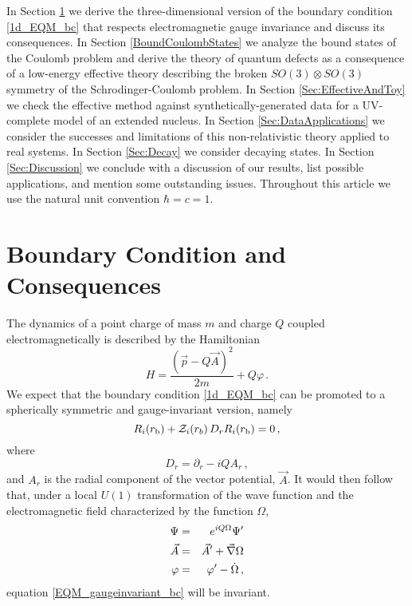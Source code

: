\documentclass[pra,twocolumn,nofootinbib, superscriptaddress]{revtex4}%
\def\sec#1{\section{#1} }
\def\({\left(}
\def\){\right)}
\def\f#1#2{\frac{#1}{#2}}
\def\d{\partial}
\def\del{\nabla}
\begin{document}
In Section \ref{Gauge_invariance} we derive the three-dimensional version of the boundary condition \eqref{1d_EQM_bc} that respects electromagnetic gauge invariance and discuss its consequences. In Section \ref{BoundCoulombStates} we analyze the bound states of the Coulomb problem and derive the theory of quantum defects as a consequence of a low-energy effective theory describing the broken $SO(3)\otimes SO(3)$ symmetry of the Schrodinger-Coulomb problem. In Section \ref{Sec:EffectiveAndToy} we check the effective method against synthetically-generated data for a UV-complete model of an extended nucleus. In Section \ref{Sec:DataApplications} we consider the successes and limitations of this non-relativistic theory applied to real systems. In Section \ref{Sec:Decay} we consider decaying states. In Section \ref{Sec:Discussion} we conclude with a discussion of our results, list possible applications, and mention some outstanding issues. Throughout this article we use the natural unit convention $\hbar=c=1$.






























\sec{Boundary Condition and Consequences}\label{Gauge_invariance}

The dynamics of a point charge of mass $m$ and charge $Q$ coupled electromagnetically is described by the Hamiltonian
\begin{equation}\label{Hamiltonian}
H=\f{\(\vec{p}-Q\vec{A}  \)^2}{2m}+Q\varphi\,.
\end{equation}
We expect that the boundary condition \eqref{1d_EQM_bc} can be promoted to a spherically symmetric and gauge-invariant version, namely
\begin{equation}\label{EQM_gaugeinvariant_bc}
R_i(r_\text{b}) + {\cal Z}_i(r_b)\, D_r R_i(r_\text{b})=0\,,
\end{equation}
where 
\begin{equation}\label{D_r_def}
D_r=\d_r - iQA_r\,,
\end{equation}
and $A_r$ is the radial component of the vector potential, $\vec{A}$. It would then follow that, under a local $U(1)$ transformation of the wave function and the electromagnetic field characterized by the function $\Omega$,
\begin{eqnarray}
\Psi &=& e^{i Q \Omega} \Psi' \notag\\
\vec{A}&=& \vec{A}'+\vec{\del} \Omega \notag\\
\varphi &=& \varphi'-\dot{\Omega} \,,
\end{eqnarray}
equation \eqref{EQM_gaugeinvariant_bc} will be invariant.
\end{document}
